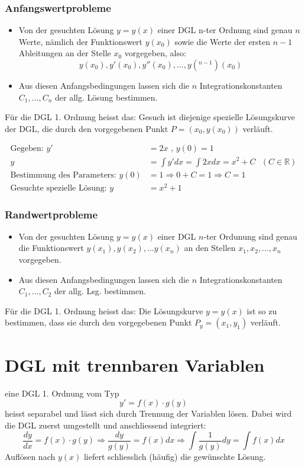 \subsubsection*{Anfangswertprobleme}

\begin{itemize}
	\item Von der gesuchten Lösung $y = y(x)$ einer DGL n-ter Ordnung sind genau $n$ Werte, nämlich der Funktionswert $y(x_0)$ sowie die Werte der ersten $n-1$ Ableitungen an der Stelle $x_0$ vorgegeben, also:
	$$y(x_0), y'(x_0), y''(x_0), ..., y(^{n-1})(x_0)$$
	\item Aus diesen Anfangsbedingungen lassen sich die $n$ Integrationskonstanten $C_1, ..., C_n$ der allg. Lösung bestimmen.
\end{itemize}
Für die DGL 1. Ordnung heisst das: Gesuch ist diejenige spezielle Lösungskurve der DGL, die durch den vorgegebenen Punkt $P = (x_0, y(x_0))$ verläuft.

\begin{bsp}
\begin{align*}
	 \text{Gegeben: } y' &= 2x\text{ , } y(0) = 1\\
	  y &= \int y' dx = \int 2x dx = x^2 + C  \text{        }(C \in \mathbb{R}) \\
	  \text{Bestimmung des Parameters: } y(0) &= 1 \Rightarrow 0 + C = 1 \Rightarrow C = 1\\
	  \text{Gesuchte spezielle Lösung: } y &= x^2 + 1
\end{align*}
\end{bsp}

\subsubsection*{Randwertprobleme}
\begin{itemize}
	\item Von der gesuchten Lösung $y=y(x)$ einer DGL $n$-ter Ordunung sind genau die Funktionswert $y(x_1), y(x_2), ... y(x_n)$ an den Stellen $x_1, x_2, ..., x_n$ vorgegeben.
	\item Aus diesen Anfangsbedingungen lassen sich die $n$ Integrationskonstanten $C_1, ..., C_2$ der allg. Lsg. bestimmen.
\end{itemize}
Für die DGL 1. Ordnung heisst das: Die Lösungskurve $y=y(x)$ ist so zu bestimmen, dass sie durch den vorgegebenen Punkt $P_y=(x_1, y_1)$ verläuft.


\section{DGL mit trennbaren Variablen}
eine DGL 1. Ordnung vom Typ
$$y' = f(x) \cdot g(y)$$
heisst separabel und lässt sich durch Trennung der Variablen lösen. Dabei wird die DGL zuerst umgestellt und anschliessend integriert:
$$\frac{dy}{dx} = f(x) \cdot g(y) \Rightarrow \frac{dy}{g(y)} = f(x) dx \Rightarrow \int \frac{1}{g(y)}dy = \int f(x)dx$$
Auflösen nach $y(x)$ liefert schliesslich (häufig) die gewünschte Lösung.

